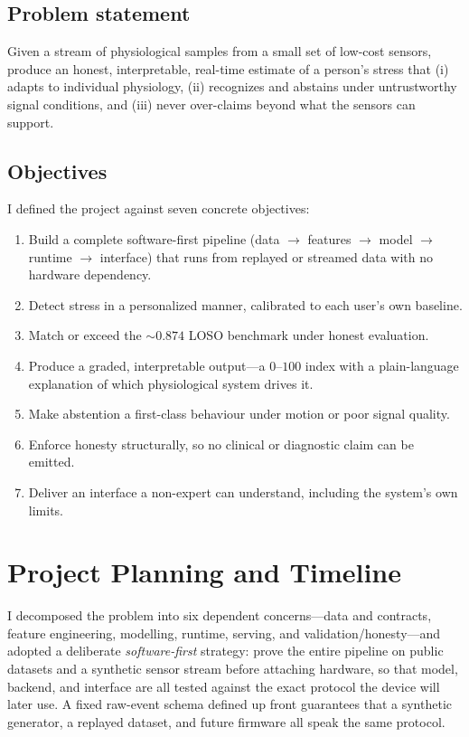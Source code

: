 \documentclass[11pt,a4paper]{article}
\begin{document}
\subsection{Problem statement}
Given a stream of physiological samples from a small set of low-cost sensors, produce an honest,
interpretable, real-time estimate of a person's stress that (i) adapts to individual physiology,
(ii) recognizes and abstains under untrustworthy signal conditions, and (iii) never over-claims
beyond what the sensors can support.

\subsection{Objectives}
I defined the project against seven concrete objectives:

\begin{enumerate}[leftmargin=1.4em,itemsep=0.1em]
  \item Build a complete software-first pipeline (data $\rightarrow$ features $\rightarrow$ model
        $\rightarrow$ runtime $\rightarrow$ interface) that runs from replayed or streamed data with
        no hardware dependency.
  \item Detect stress in a personalized manner, calibrated to each user's own baseline.
  \item Match or exceed the $\sim\!0.874$ LOSO benchmark under honest evaluation.
  \item Produce a graded, interpretable output---a $0$--$100$ index with a plain-language
        explanation of which physiological system drives it.
  \item Make abstention a first-class behaviour under motion or poor signal quality.
  \item Enforce honesty structurally, so no clinical or diagnostic claim can be emitted.
  \item Deliver an interface a non-expert can understand, including the system's own limits.
\end{enumerate}

\section{Project Planning and Timeline}

I decomposed the problem into six dependent concerns---data and contracts, feature engineering,
modelling, runtime, serving, and validation/honesty---and adopted a deliberate \emph{software-first}
strategy: prove the entire pipeline on public datasets and a synthetic sensor stream before
attaching hardware, so that model, backend, and interface are all tested against the exact protocol
the device will later use. A fixed raw-event schema defined up front guarantees that a synthetic
generator, a replayed dataset, and future firmware all speak the same protocol.
\end{document}
